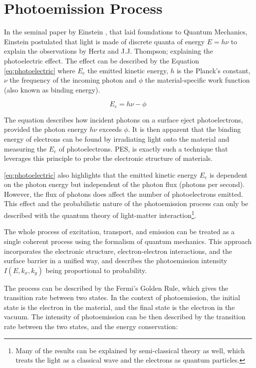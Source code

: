 \section{Photoemission Process}\label{section:photoemission-process}
In the seminal paper by Einstein \cite{einsteinUberErzeugungUnd1905}, that laid foundations to Quantum Mechanics, Einstein postulated that light is made of discrete quanta of energy $E = h\nu$ to explain the observations by Hertz and J.J. Thompson; explaining the photoelectric effect. The effect can be described by the Equation \ref{eq:photoelectric} where $E_e$ the emitted kinetic energy, $h$ is the Planck's constant, $\nu$ the frequency of the incoming photon and  $\phi$ the material-specific work function (also known as binding energy). 

\begin{equation}\label{eq:photoelectric}
    E_e = h\nu - \phi
\end{equation}

The equation describes how incident photons on a surface eject photoelectrons, provided the photon energy $h\nu$ exceeds $\phi$.
It is then apparent that the binding energy of electrons can be found by irradiating light onto the material and measuring the $E_e$ of photoelectrons. \Gls{PES}, is exactly such a technique that leverages this principle to probe the electronic structure of materials.

\cref{eq:photoelectric} also highlights that the emitted kinetic energy $E_e$ is dependent on the photon energy but independent of the photon flux (photons per second). However, the flux of photons does affect the number of photoelectrons emitted. This effect and the probabilistic nature of the photoemission process can only be described with the quantum theory of light-matter interaction\footnote{Many of the results can be explained by semi-classical theory as well, which treats the light as a classical wave and the electrons as quantum particles.}.

The whole process of excitation, transport, and emission can be treated as a single coherent process using the formalism of quantum mechanics. This approach incorporates the electronic structure, electron-electron interactions, and the surface barrier in a unified way, and describes the photoemission intensity  $I(E, k_x, k_y)$ being proportional to probability.

The process can be described by the Fermi's Golden Rule, which gives the transition rate between two states. In the context of photoemission, the initial state is the electron in the material, and the final state is the electron in the vacuum. The intensity of photoemission can be then described by the transition rate between the two states, and the energy conservation:

